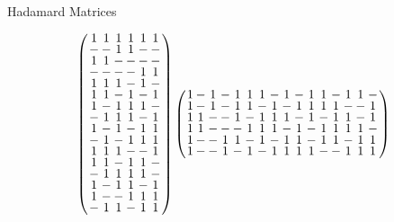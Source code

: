 \documentclass{beamer}
\begin{document}
\begin{frame}{Hadamard Matrices}

  \[
    \arraycolsep=1.0pt\def\arraystretch{0.75}
    \left(
      \begin{array}{cccccc}
        1&1&1&1&1&1\\
        -&-&1&1&-&-\\
        1&1&-&-&-&-\\
        -&-&-&-&1&1\\
        1&1&1&-&1&-\\
        1&1&-&1&-&1\\
        1&-&1&1&1&-\\
        -&1&1&1&-&1\\
        1&-&1&-&1&1\\
        -&1&-&1&1&1\\
        1&1&1&-&-&1\\
        1&1&-&1&1&-\\
        -&1&1&1&1&-\\
        1&-&1&1&-&1\\
        1&-&-&1&1&1\\
        -&1&1&-&1&1\\
      \end{array}
    \right)
    \arraycolsep=1.0pt\def\arraystretch{0.75}
    \left(
      \begin{array}{cccccccccccccccc}
        1&-&1&-&1&1&1&-&1&-&1&1&-&1&1&-\\
        1&-&1&-&1&1&-&1&-&1&1&1&1&-&-&1\\
        1&1&-&-&1&-&1&1&1&-&1&-&1&1&-&1\\
        1&1&-&-&-&1&1&1&-&1&-&1&1&1&1&-\\
        1&-&-&1&1&-&1&-&1&1&-&1&1&-&1&1\\
        1&-&-&1&-&1&-&1&1&1&1&-&-&1&1&1\\
      \end{array}
    \right)
  \]
  
\end{frame}
\end{document}
